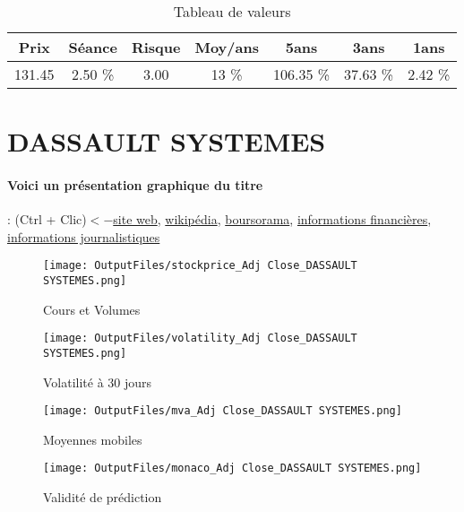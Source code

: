 \documentclass[11pt,a4paper]{report}%
\begin{document}
\begin{table}[H]
  \centering
    \begin{tabular}{|c|c|c|c|c|c|c|}
    \hline
    Prix & Séance & Risque  & Moy/ans & 5ans & 3ans & 1ans \\
    \hline
    131.45 &    2.50 \%    & 3.00 & 13 \% & 106.35 \% & 37.63 \% & 2.42 \% \\
    \hline
    \end{tabular}%
        \label{tab:table_CAPGEMINI}%
      \caption{Tableau de valeurs}
\end{table}%

\newpage

\section{DASSAULT SYSTEMES}

\paragraph{Voici un présentation graphique du titre} : (Ctrl + Clic)$<-$\href{https://investor.3ds.com/fr}{site web}, \href{https://fr.wikipedia.org/wiki/Dassault_Systèmes}{wikipédia}, \href{https://www.boursorama.com/cours/1rPDSY}{boursorama}, \href{https://www.qwant.com/?q=site:https:%2f%2fwww.easybourse.com%2faction-societe%2fDASSAULT-SYSTEMES&t=web&client=ext-firefox-hp}{informations financières}, \href{https://bourse.lerevenu.com/cours-de-bourse/fiche-valeur-synthese/DASSAULT-SYSTEMES/DSY-FR}{informations journalistiques}
\begin{figure}[!htb]
   \begin{minipage}{0.5\textwidth}
     \centering
     \texttt{[image: OutputFiles/stockprice\_Adj Close\_DASSAULT SYSTEMES.png]}
     \caption{Cours et Volumes}\label{Fig:price_DASSAULT SYSTEMES}
   \end{minipage}\hfill
   \begin{minipage}{0.5\textwidth}
     \centering
     \texttt{[image: OutputFiles/volatility\_Adj Close\_DASSAULT SYSTEMES.png]}
     \caption{Volatilité à 30 jours}\label{Fig:volat_DASSAULT SYSTEMES}
   \end{minipage}
\end{figure}
\begin{figure}[!htb]
   \begin{minipage}{0.5\textwidth}
     \centering
     \texttt{[image: OutputFiles/mva\_Adj Close\_DASSAULT SYSTEMES.png]}
     \caption{Moyennes mobiles}\label{Fig:mva_DASSAULT SYSTEMES}
   \end{minipage}\hfill
   \begin{minipage}{0.5\textwidth}
     \centering
     \texttt{[image: OutputFiles/monaco\_Adj Close\_DASSAULT SYSTEMES.png]}
     \caption{Validité de prédiction}\label{Fig:prediction_DASSAULT SYSTEMES}
   \end{minipage}
\end{figure}
\end{document}
